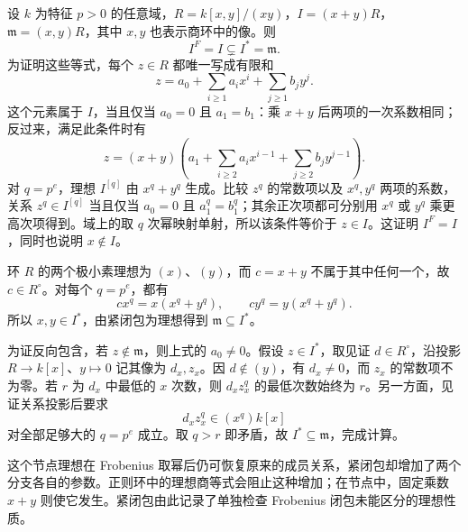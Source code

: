 \begin{example}\label{b3:exm:C-node-tight-versus-frobenius}
	设 \(k\) 为特征 \(p>0\) 的任意域，\(R=k[x,y]/(xy)\)，\(I=(x+y)R\)，\(\mathfrak m=(x,y)R\)，其中 \(x,y\) 也表示商环中的像。则
	\[
		I^F=I\subsetneq I^*=\mathfrak m.
	\]
	为证明这些等式，每个 \(z\in R\) 都唯一写成有限和
	\[
		z=a_0+\sum_{i\ge1}a_i x^i+\sum_{j\ge1}b_j y^j.
	\]
	这个元素属于 \(I\)，当且仅当 \(a_0=0\) 且 \(a_1=b_1\)：乘 \(x+y\) 后两项的一次系数相同；反过来，满足此条件时有
	\[
		z=(x+y)\left(a_1+\sum_{i\ge2}a_i x^{i-1}
		+\sum_{j\ge2}b_j y^{j-1}\right).
	\]
	对 \(q=p^e\)，理想 \(I^{[q]}\) 由 \(x^q+y^q\) 生成。比较 \(z^q\) 的常数项以及 \(x^q,y^q\) 两项的系数，关系 \(z^q\in I^{[q]}\) 当且仅当 \(a_0=0\) 且 \(a_1^q=b_1^q\)；其余正次项都可分别用 \(x^q\) 或 \(y^q\) 乘更高次项得到。域上的取 \(q\) 次幂映射单射，所以该条件等价于 \(z\in I\)。这证明 \(I^F=I\)，同时也说明 \(x\notin I\)。

	环 \(R\) 的两个极小素理想为 \((x)\)、\((y)\)，而 \(c=x+y\) 不属于其中任何一个，故 \(c\in R^\circ\)。对每个 \(q=p^e\)，都有
	\[
		cx^q=x(x^q+y^q),\qquad
		cy^q=y(x^q+y^q).
	\]
	所以 \(x,y\in I^*\)，由紧闭包为理想得到 \(\mathfrak m\subseteq I^*\)。

	为证反向包含，若 \(z\notin\mathfrak m\)，则上式的 \(a_0\ne0\)。假设 \(z\in I^*\)，取见证 \(d\in R^\circ\)，沿投影 \(R\rightarrow k[x]\)、\(y\mapsto0\) 记其像为 \(d_x,z_x\)。因 \(d\notin(y)\)，有 \(d_x\ne0\)，而 \(z_x\) 的常数项不为零。若 \(r\) 为 \(d_x\) 中最低的 \(x\) 次数，则 \(d_xz_x^q\) 的最低次数始终为 \(r\)。另一方面，见证关系投影后要求
	\[
		d_xz_x^q\in(x^q)k[x]
	\]
	对全部足够大的 \(q=p^e\) 成立。取 \(q>r\) 即矛盾，故 \(I^*\subseteq\mathfrak m\)，完成计算。
\end{example}

这个节点理想在 Frobenius 取幂后仍可恢复原来的成员关系，紧闭包却增加了两个分支各自的参数。正则环中的理想商等式会阻止这种增加；在节点中，固定乘数 \(x+y\) 则使它发生。紧闭包由此记录了单独检查 Frobenius 闭包未能区分的理想性质。
